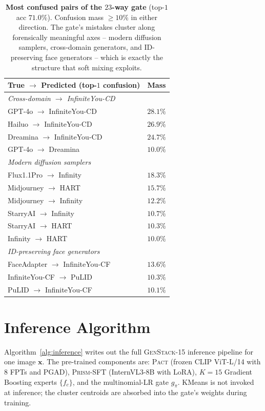 \documentclass[10pt,twocolumn,letterpaper]{article}
\newcommand{\vfive}{\textsc{Pact}}
\newcommand{\prism}{\textsc{Prism-SFT}}
\begin{document}
\begin{table}[t]
\centering
\footnotesize
\setlength{\tabcolsep}{4pt}
\caption{\textbf{Most confused pairs of the $23$-way gate} (top-$1$ acc $71.0\%$). Confusion mass $\ge\!10\%$ in either direction. The gate's mistakes cluster along forensically meaningful axes -- modern diffusion samplers, cross-domain generators, and ID-preserving face generators -- which is exactly the structure that soft mixing exploits.}
\label{tab:gate_confusion}
\begin{tabular}{l c}
\toprule
True $\to$ Predicted (top-$1$ confusion) & Mass \\
\midrule
\multicolumn{2}{l}{\emph{Cross-domain $\to$ InfiniteYou-CD}} \\
GPT-4o $\to$ InfiniteYou-CD       & $28.1\%$ \\
Hailuo $\to$ InfiniteYou-CD       & $26.9\%$ \\
Dreamina $\to$ InfiniteYou-CD     & $24.7\%$ \\
GPT-4o $\to$ Dreamina             & $10.0\%$ \\
\midrule
\multicolumn{2}{l}{\emph{Modern diffusion samplers}} \\
Flux1.1Pro $\to$ Infinity         & $18.3\%$ \\
Midjourney $\to$ HART             & $15.7\%$ \\
Midjourney $\to$ Infinity         & $12.2\%$ \\
StarryAI $\to$ Infinity           & $10.7\%$ \\
StarryAI $\to$ HART               & $10.3\%$ \\
Infinity $\to$ HART               & $10.0\%$ \\
\midrule
\multicolumn{2}{l}{\emph{ID-preserving face generators}} \\
FaceAdapter $\to$ InfiniteYou-CF  & $13.6\%$ \\
InfiniteYou-CF $\to$ PuLID        & $10.3\%$ \\
PuLID $\to$ InfiniteYou-CF        & $10.1\%$ \\
\bottomrule
\end{tabular}
\end{table}

\section{Inference Algorithm}
\label{sec:algo}

Algorithm~\ref{alg:inference} writes out the full \textsc{GenStack-15} inference pipeline for one image $\mathbf{x}$. The pre-trained components are: \vfive{} (frozen CLIP ViT-L/14 with $8$ FPTs and PGAD), \prism{} (InternVL3-8B with LoRA), $K{=}15$ Gradient Boosting experts $\{f_c\}$, and the multinomial-LR gate $g_\pi$. KMeans is not invoked at inference; the cluster centroids are absorbed into the gate's weights during training.
\end{document}
